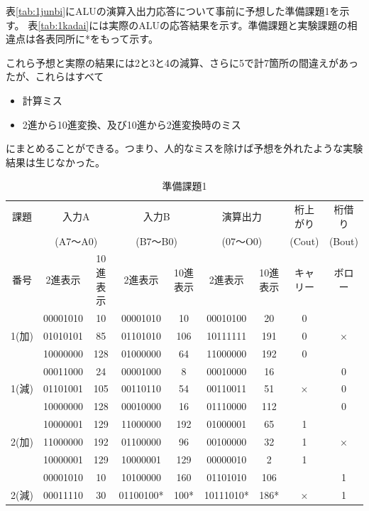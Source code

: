 \documentclass[11pt,a4j]{jsarticle}
\begin{document}
  表\ref{tab:1junbi}にALUの演算入出力応答について事前に予想した準備課題1を示す。
  表\ref{tab:1kadai}には実際のALUの応答結果を示す。準備課題と実験課題の相違点は各表同所に*をもって示す。
  
  これら予想と実際の結果には2と3と4の減算、さらに5で計7箇所の間違えがあったが、これらはすべて
  \begin{itemize}
  \item 計算ミス
  \item 2進から10進変換、及び10進から2進変換時のミス
  \end{itemize}
  にまとめることができる。つまり、人的なミスを除けば予想を外れたような実験結果は生じなかった。
  
  \begin{table}[htb]
  \begin{center}
    \caption{準備課題1}
    \begin{tabular}{|c|c|c|c|c|c|c|c|c|} \hline
課題 & \multicolumn{2}{|c|}{入力A} & \multicolumn{2}{|c|}{入力B} & \multicolumn{2}{|c|}{演算出力} & 桁上がり & 桁借り\\
 & \multicolumn{2}{|c|}{(A7～A0)} & \multicolumn{2}{|c|}{(B7～B0)} & \multicolumn{2}{|c|}{(07～O0)} & (Cout) & (Bout) \\ \cline{2-7}
番号 & 2進表示 & 10進表示 & 2進表示 & 10進表示 & 2進表示 & 10進表示 & キャリー & ボロー \\ \hline
 & 00001010 & 10 & 00001010 &10  &00010100  & 20 & 0 &  \\ \cline{2-8}
1(加) & 01010101 & 85 & 01101010 &106  &10111111  & 191 & 0 & × \\ \cline{2-8}
 & 10000000 & 128 & 01000000 &64  & 11000000 & 192 & 0 &  \\ \hline
 & 00011000 &24  & 00001000 &8  &00010000  & 16 &  & 0 \\ \cline{2-7}\cline{9-9}
1(減) & 01101001 & 105 &00110110  &54  & 00110011 & 51 & × & 0 \\ \cline{2-7}\cline{9-9}
 & 10000000 & 128 &00010000  & 16 &01110000  & 112 &  & 0 \\ \hline
 & 10000001 & 129 &11000000  & 192 &01000001  &65  & 1 &  \\ \cline{2-8}
2(加) & 11000000 & 192 & 01100000 &96  &00100000  &32  & 1 & × \\ \cline{2-8}
 & 10000001 &  129& 10000001 & 129 &00000010  & 2 & 1 &  \\ \hline
 & 00001010 &10  &10100000  &160  &01101010  &106  &  & 1 \\ \cline{2-7}\cline{9-9}
2(減) & 00011110 &  30&01100100*  & 100* & 10111010* &186*  & × & 1 \\ \cline{2-7}\cline{9-9}

\end{tabular}
\end{center}
\end{table}
\end{document}
